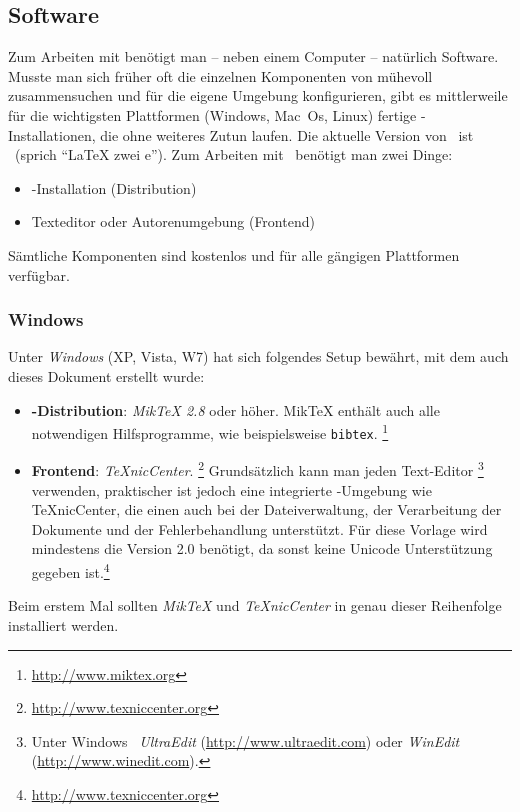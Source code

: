\subsection{Software}

Zum Arbeiten mit \latex benötigt man -- neben einem Computer -- natürlich Software. Musste man sich früher oft die einzelnen Komponenten von \latex mühevoll zusammensuchen und für die eigene Umgebung konfigurieren, gibt es mittlerweile für die wichtigsten Plattformen (Windows, Mac~Os, Linux) fertige \latex-Installationen, die ohne weiteres Zutun laufen. Die aktuelle Version von \latex\ ist \LaTeXe\ (sprich "`LaTeX zwei e"'). 
Zum Arbeiten mit \latex\ benötigt man zwei Dinge:
%
\begin{itemize}
\item \latex-Installation (Distribution)
\item Texteditor oder Autorenumgebung (Frontend)
\end{itemize}
%
Sämtliche Komponenten sind kostenlos und für alle gängigen Plattformen verfügbar.


\subsubsection{Windows}

Unter \emph{Windows} (XP, Vista, W7) hat sich folgendes Setup bewährt,
mit dem \ua auch dieses Dokument erstellt wurde:
%
\begin{itemize}
\item \textbf{\latex-Distribution}: \emph{MikTeX 2.8} oder höher.
MikTeX enthält auch alle notwendigen Hilfsprogramme, wie beispielsweise {\tt bibtex}.%
\footnote{\url{http://www.miktex.org}}


\item \textbf{Frontend}: \emph{TeXnicCenter}.%
\footnote{\url{http://www.texniccenter.org}}
Grundsätzlich kann man jeden Text-Editor%
\footnote{Unter Windows \zB\ \emph{Ultra\-Edit} (\url{http://www.ultraedit.com})
oder \emph{WinEdit} (\url{http://www.winedit.com}).} verwenden, praktischer ist jedoch eine integrierte \latex-Umgebung wie TeXnicCenter, die einen auch bei 
der Dateiverwaltung, der Verarbeitung der Dokumente und der Fehlerbehandlung unterstützt. Für diese Vorlage wird mindestens die Version 2.0 benötigt, da sonst keine Unicode Unterstützung gegeben ist.\footnote{\url{http://www.texniccenter.org}}
%
\end{itemize}
Beim erstem Mal sollten \emph{MikTeX} und \emph{TeXnicCenter} in genau dieser Reihenfolge installiert werden.

